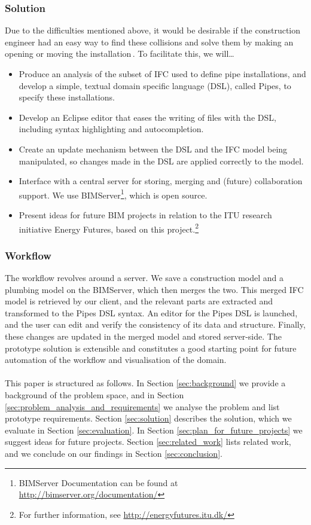 \subsubsection{Solution}
Due to the difficulties mentioned above, it would be desirable if the construction engineer had an easy way to find these collisions and solve them by making an opening or moving the installation\,\cite{jorgensen12}. To facilitate this, we will…
\begin{itemize}
\item Produce an analysis of the subset of IFC used to define pipe installations, and develop a simple, textual domain specific language (DSL), called Pipes, to specify these installations.
\item Develop an Eclipse editor that eases the writing of files with the DSL, including syntax highlighting and autocompletion.
\item Create an update mechanism between the DSL and the IFC model being manipulated, so changes made in the DSL are applied correctly to the model.
\item Interface with a central server for storing, merging and (future) collaboration support. We use BIMServer\footnote{BIMServer Documentation can be found at \url{http://bimserver.org/documentation/}}, which is open source.
\item Present ideas for future BIM projects in relation to the ITU research initiative Energy Futures, based on this project.\footnote{For further information, see \url{http://energyfutures.itu.dk/}}
\end{itemize}

\subsubsection{Workflow}
\label{sec:workflow}
The workflow revolves around a server. We save a construction model and a plumbing model on the BIMServer, which then merges the two. This merged IFC model is retrieved by our client, and the relevant parts are extracted and transformed to the Pipes DSL syntax. An editor for the Pipes DSL is launched, and the user can edit and verify the consistency of its data and structure. Finally, these changes are updated in the merged model and stored server-side. The prototype solution is extensible and constitutes a good starting point for future automation of the workflow and visualisation of the domain.

\paragraph{}
This paper is structured as follows. In Section \ref{sec:background} we provide a background of the problem space, and in Section \ref{sec:problem_analysis_and_requirements} we analyse the problem and list prototype requirements. Section \ref{sec:solution} describes the solution, which we evaluate in Section \ref{sec:evaluation}. In Section \ref{sec:plan_for_future_projects} we suggest ideas for future projects. Section \ref{sec:related_work} lists related work, and we conclude on our findings in Section \ref{sec:conclusion}.
